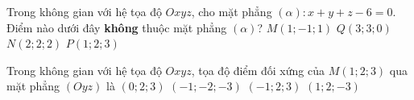 \begin{ex}%
	Trong không gian với hệ tọa độ $Oxyz$, cho mặt phẳng $(\alpha): x+y+z-6=0$. Điểm nào dưới đây \textbf{không} thuộc mặt phẳng $(\alpha)$?
	\choice
	{\True $M(1; -1; 1)$}
	{$Q(3; 3; 0)$}
	{$N(2; 2; 2)$}
	{$P(1; 2; 3)$}
\end{ex}
\begin{ex}%
	Trong không gian với hệ tọa độ $ Oxyz $, tọa độ điểm đối xứng của $ M(1;2;3) $ qua mặt phẳng $ (Oyz) $ là 
	\choice
	{$ (0;2;3) $}
	{$ (-1;-2;-3) $}
	{\True $ (-1;2;3) $}
	{$ (1;2;-3) $}
\end{ex}


